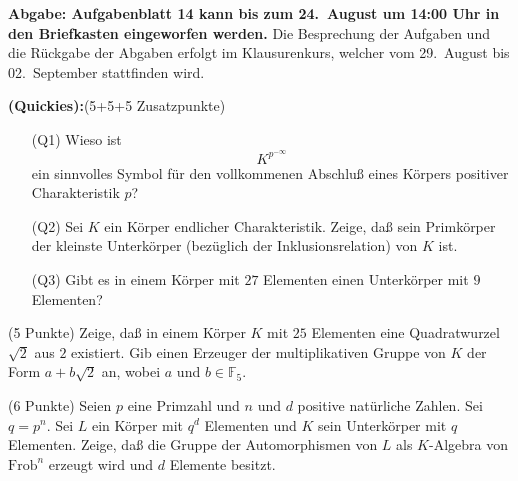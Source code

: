\documentclass{algsheet}
\author{Dipl.-Math.~Franz Vogler}
\date{25.~Juli 2011}
\begin{document}
                \maketitle



\textbf{Abgabe: Aufgabenblatt 14 kann bis zum 24.~August um 14:00 Uhr in den Briefkasten eingeworfen werden.}
\newline
Die Besprechung der Aufgaben und die Rückgabe der Abgaben erfolgt im Klausurenkurs, welcher vom 29.~August bis 02.~September stattfinden wird. 






\begin{exercise}\textbf{(Quickies):}(5+5+5 Zusatzpunkte)\vspace{-1ex}
   \begin{itemize}
       \item[(Q1)]     Wieso ist
    \begin{equation}
        K^{p^{-\infty}}
    \end{equation}
    ein sinnvolles Symbol für den vollkommenen Abschluß eines Körpers positiver
    Charakteristik \(p\)?
       \item[(Q2)] Sei \(K\) ein Körper endlicher Charakteristik. Zeige, daß sein Primkörper der
    kleinste Unterkörper (bezüglich der Inklusionsrelation) von \(K\) ist.
       \item[(Q3)] Gibt es in einem Körper mit \(27\) Elementen einen Unterkörper mit \(9\)
    Elementen?
   \end{itemize}
\end{exercise}



\begin{exercise}(5 Punkte)\newline
    Zeige, daß in einem Körper \(K\) mit \(25\) Elementen eine Quadratwurzel
    \(\sqrt 2\) aus \(2\) existiert. Gib einen Erzeuger der multiplikativen Gruppe
    von \(K\) der Form \(a + b \sqrt 2\) an, wobei \(a\) und \(b \in \mathbb F_5\).
\end{exercise}


\begin{exercise}(6 Punkte)\newline
    Seien \(p\) eine Primzahl und \(n\) und \(d\) positive natürliche
    Zahlen. Sei \(q = p^n\). Sei \(L\) ein Körper mit \(q^d\) Elementen und
    \(K\) sein Unterkörper mit \(q\) Elementen. Zeige, daß die Gruppe der
    Automorphismen von \(L\) als \(K\)-Algebra von \(\mathrm{Frob}^n\) erzeugt wird und
    \(d\) Elemente besitzt.
\end{exercise}
\end{document}
